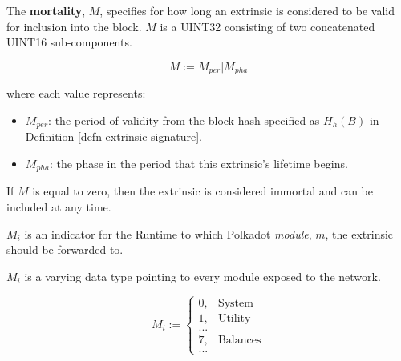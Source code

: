 \begin{definition}
    \label{defn-extrinsic-mortality}
    The \textbf{mortality}, $M$, specifies for how long an extrinsic is considered to
    be valid for inclusion into the block. $M$ is a UINT32 consisting of two concatenated
    UINT16 sub-components.

    \[
        M := M_{per} | M_{pha}
    \]

    where each value represents:

    \begin{itemize}
        \item $M_{per}$: the period of validity from the block hash
        specified as $H_h(B)$ in Definition \ref{defn-extrinsic-signature}.
        \item $M_{pha}$: the phase in the period that this extrinsic's lifetime begins.
    \end{itemize}

    If $M$ is equal to zero, then the extrinsic is considered immortal and can
    be included at any time.
    \newline

\end{definition}

\begin{definition}
    \label{defn-module-indicator}
    $M_i$ is an indicator for the Runtime to which Polkadot \textit{module},
    $m$, the extrinsic should be forwarded to.
    \newline

    $M_i$ is a varying data type pointing to every module exposed to the
    network.

    \[
    M_i :=
    \begin{cases}
    0, & \text{System} \\
    1, & \text{Utility} \\
    ... & \\
    7, & \text{Balances} \\
    ... &
    \end{cases}
    \]
\end{definition}

